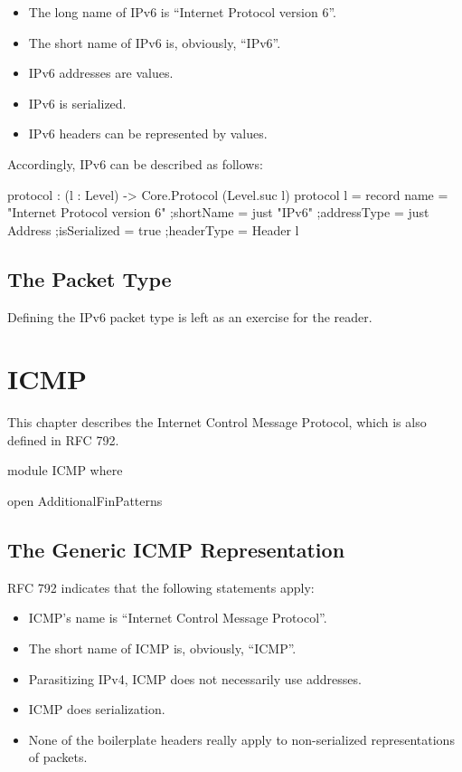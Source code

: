 \documentclass{report}
\begin{document}
\begin{itemize}
  \item The long name of IPv6 is ``Internet Protocol version 6''.
  \item The short name of IPv6 is, obviously, ``IPv6''.
  \item IPv6 addresses are  values.
  \item IPv6 is serialized.
  \item IPv6 headers can be represented by  values.
\end{itemize}

Accordingly, IPv6 can be described as follows:

\begin{code}
  protocol : (l : Level) -> Core.Protocol (Level.suc l)
  protocol l = record
    {name = "Internet Protocol version 6"
    ;shortName = just "IPv6"
    ;addressType = just Address
    ;isSerialized = true
    ;headerType = Header l
    }
\end{code}

\section{The Packet Type}
Defining the IPv6 packet type is left as an exercise for the reader.

\chapter{ICMP}
This chapter describes the Internet Control Message Protocol, which is also defined in RFC 792.

\begin{code}
module ICMP where

  open AdditionalFinPatterns
\end{code}

\section{The Generic ICMP Representation}
RFC 792 indicates that the following statements apply:

\begin{itemize}
  \item ICMP's name is ``Internet Control Message Protocol''.
  \item The short name of ICMP is, obviously, ``ICMP''.
  \item Parasitizing IPv4, ICMP does not necessarily use addresses.
  \item ICMP does serialization.
  \item None of the boilerplate headers really apply to non-serialized representations of packets.
\end{itemize}
\end{document}
